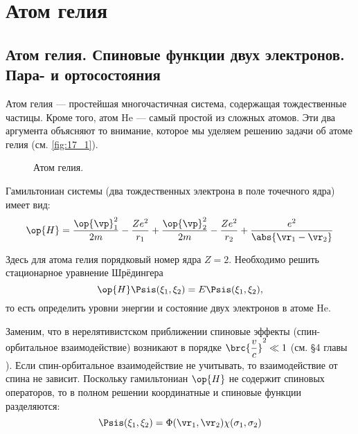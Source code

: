 \chapter{Атом гелия}

\section{Атом гелия. Спиновые функции двух электронов. Пара- и ортосостояния}

Атом гелия --- простейшая многочастичная система, содержащая тождественные частицы. Кроме того, атом He --- самый простой из сложных атомов. Эти два аргумента объясняют то внимание, которое мы уделяем решению задачи об атоме гелия (см. \autoref{fig:17_1}).
\begin{figure}[h!]
\centering
{}
\caption{Атом гелия.} \label{fig:17_1}
\end{figure}

Гамильтониан системы (два тождественных электрона в поле точечного ядра) имеет вид:
\begin{equation}
\label{eq:17_1_1}
\op{H} = \frac{\op{\vp}_1^2}{2m} - \frac{Ze^2}{r_1} + \frac{\op{\vp}_2^2}{2m} - \frac{Ze^2}{r_2} + \frac{e^2}{\abs{\vr_1 - \vr_2}}
\end{equation}

Здесь для атома гелия порядковый номер ядра $Z = 2$. Необходимо решить стационарное уравнение Шрёдингера
\begin{equation}
\label{eq:17_1_2}
\op{H} \Psis(\xi_1, \xi_2) =E\Psis(\xi_1, \xi_2),
\end{equation}
то есть определить уровни энергии и состояние двух электронов в атоме He.

Заменим, что в нерелятивистском приближении спиновые эффекты (спин-орбитальное взаимодействие) возникают в порядке $\brc{\dfrac{v}{c}}^2 \ll 1$ (см. \S 4 главы ). Если спин-орбитальное взаимодействие не учитывать, то взаимодействие от спина не зависит. Поскольку гамильтониан $\op{H}$ не содержит спиновых операторов, то в полном решении координатные и спиновые функции разделяются:
$$
\Psis(\xi_1, \xi_2) = \Phi(\vr_1, \vr_2) \chi(\sigma_1, \sigma_2)
$$

